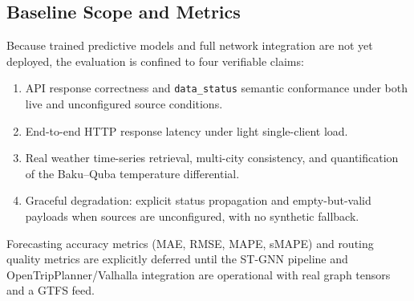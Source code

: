 \subsection{Baseline Scope and Metrics}

Because trained predictive models and full network integration are not yet
deployed, the evaluation is confined to four verifiable claims:
\begin{enumerate}
  \item API response correctness and \texttt{data\_status} semantic
        conformance under both live and unconfigured source conditions.
  \item End-to-end HTTP response latency under light single-client load.
  \item Real weather time-series retrieval, multi-city consistency, and
        quantification of the Baku--Quba temperature differential.
  \item Graceful degradation: explicit status propagation and empty-but-valid
        payloads when sources are unconfigured, with no synthetic fallback.
\end{enumerate}
Forecasting accuracy metrics (MAE, RMSE, MAPE, sMAPE) and routing quality
metrics are explicitly deferred until the ST-GNN pipeline and
OpenTripPlanner/Valhalla integration are operational with real graph tensors
and a GTFS feed.
